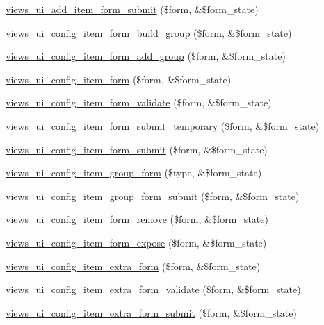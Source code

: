 \begin{DoxyCompactItemize}
\item 
\hyperlink{admin_8inc_ab9af88d70446a68c6fac8afe2bc4cffe}{views\_\-ui\_\-add\_\-item\_\-form\_\-submit} (\$form, \&\$form\_\-state)
\item 
\hyperlink{admin_8inc_acc68238a1d6afd3c96bc9799b5c000a9}{views\_\-ui\_\-config\_\-item\_\-form\_\-build\_\-group} (\$form, \&\$form\_\-state)
\item 
\hyperlink{admin_8inc_aeb1384000a460e3ff94fe2dd22339ff1}{views\_\-ui\_\-config\_\-item\_\-form\_\-add\_\-group} (\$form, \&\$form\_\-state)
\item 
\hyperlink{admin_8inc_aaee6bed5581c5d6852139a0a9605bc39}{views\_\-ui\_\-config\_\-item\_\-form} (\$form, \&\$form\_\-state)
\item 
\hyperlink{admin_8inc_a023993084cf3409a55a8831df1d0935b}{views\_\-ui\_\-config\_\-item\_\-form\_\-validate} (\$form, \&\$form\_\-state)
\item 
\hyperlink{admin_8inc_a1925902f1636137e1b003a2b26667133}{views\_\-ui\_\-config\_\-item\_\-form\_\-submit\_\-temporary} (\$form, \&\$form\_\-state)
\item 
\hyperlink{admin_8inc_af158b94f2b2f0886fde847d3f378c8ed}{views\_\-ui\_\-config\_\-item\_\-form\_\-submit} (\$form, \&\$form\_\-state)
\item 
\hyperlink{admin_8inc_a2ae4ffd902cc9eb9ac94f7ed69ffe81a}{views\_\-ui\_\-config\_\-item\_\-group\_\-form} (\$type, \&\$form\_\-state)
\item 
\hyperlink{admin_8inc_a88a6d4a52ff968ae9dd477d60c715d50}{views\_\-ui\_\-config\_\-item\_\-group\_\-form\_\-submit} (\$form, \&\$form\_\-state)
\item 
\hyperlink{admin_8inc_a7f602db6d4cc41b412a8ace2d6320ea8}{views\_\-ui\_\-config\_\-item\_\-form\_\-remove} (\$form, \&\$form\_\-state)
\item 
\hyperlink{admin_8inc_a3a3a7734f5b034e63b7866c326c70229}{views\_\-ui\_\-config\_\-item\_\-form\_\-expose} (\$form, \&\$form\_\-state)
\item 
\hyperlink{admin_8inc_a5b64eabdfcbc477462d3db321dccd969}{views\_\-ui\_\-config\_\-item\_\-extra\_\-form} (\$form, \&\$form\_\-state)
\item 
\hyperlink{admin_8inc_a70cfe0eb4a09c66d85dc24fd55a57b30}{views\_\-ui\_\-config\_\-item\_\-extra\_\-form\_\-validate} (\$form, \&\$form\_\-state)
\item 
\hyperlink{admin_8inc_ad5e1d436875b612146deb11b52a3b98e}{views\_\-ui\_\-config\_\-item\_\-extra\_\-form\_\-submit} (\$form, \&\$form\_\-state)
\item 

\end{DoxyCompactItemize}

